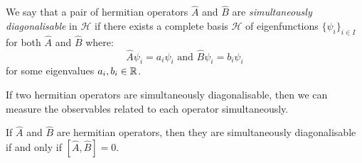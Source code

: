 \documentclass[../main.tex]{subfiles}
\begin{document}
\begin{definition}
  We say that a pair of hermitian operators $\hat{A}$ and $\hat{B}$ are \textit{simultaneously diagonalisable} in $\mathcal{H}$ if there exists a complete basis $\mathcal{H}$ of eigenfunctions $\{\psi_i\}_{i \in I}$ for both $\hat{A}$ and $\hat{B}$ where:
  \[
    \hat{A} \psi_i = a_i \psi_i \text{ and } \hat{B} \psi_i = b_i \psi_i
  \]
  for some eigenvalues $a_i, b_i \in \mathbb{R}$.
\end{definition}
\begin{remark}
  If two hermitian operators are simultaneously diagonalisable, then we can measure the observables related to each operator simultaneously.
\end{remark}
\begin{theorem}
  If $\hat{A}$ and $\hat{B}$ are hermitian operators, then they are simultaneously diagonalisable if and only if $[\hat{A}, \hat{B}] = 0$. \label{simDiag}
\end{theorem}
\end{document}
